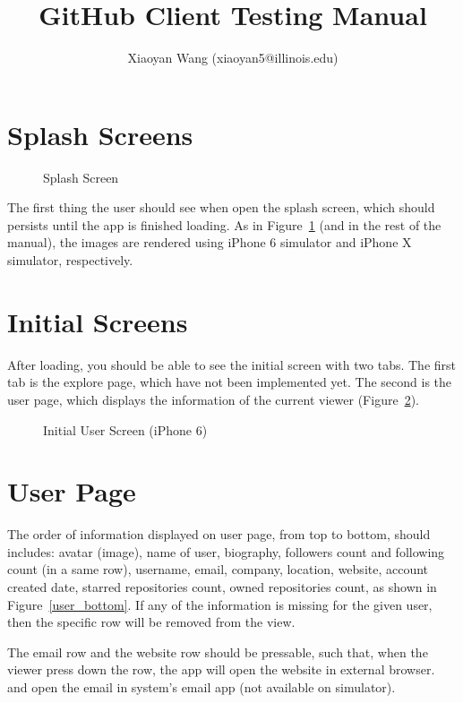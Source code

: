 \documentclass[12pt]{article}
\title{GitHub Client Testing Manual}
\author{Xiaoyan Wang (xiaoyan5@illinois.edu)}
\newcommand{\imgh}[4]{
    \begin{figure}[!htbp]%
    \begin{center}
    \subfloat{{\texttt{[image: \#2]} }}%
    \qquad
    \subfloat{{\texttt{[image: \#3]} }}%
    \caption{#4}\label{#2}
    \end{center}
\end{figure}
}
\begin{document}
\maketitle

\tableofcontents

\newcommand{\sectionbreak}{\clearpage}


\section{Splash Screens}

\imgh{0.45}{splash_screen}{splash_screen_iphoneX}{Splash Screen}

The first thing the user should see when open the splash screen, which should persists until the app is finished loading. As in Figure~\ref{splash_screen} (and in the rest of the manual), the images are rendered using iPhone 6 simulator and iPhone X simulator, respectively.

\section{Initial Screens}

After loading, you should be able to see the initial screen with two tabs. The first tab is the explore page, which have not been implemented yet. The second is the user page, which displays the information of the current viewer (Figure~\ref{initial_explore}).

\imgh{0.45}{initial_explore}{initial_user}{Initial User Screen (iPhone 6)}

\section{User Page}

The order of information displayed on user page, from top to bottom, should includes: avatar (image), name of user, biography, followers count and following count (in a same row), username, email, company, location, website, account created date, starred repositories count, owned repositories count, as shown in Figure~\ref{user_bottom}. If any of the information is missing for the given user, then the specific row will be removed from the view.

The email row and the website row should be pressable, such that, when the viewer press down the row, the app will open the website in external browser. and open the email in system's email app (not available on simulator).
\end{document}
